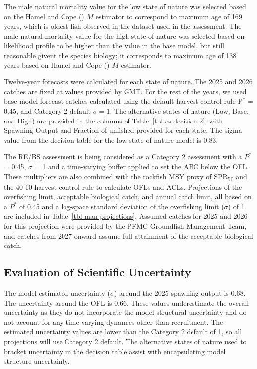 \documentclass[
]{article}
\begin{document}
The male natural mortality value for the low state of nature was
selected based on the Hamel and Cope
() \(M\) estimator to
correspond to maximum age of 169 years, which is oldest fish observed in
the dataset used in the assessment. The male natural mortality value for
the high state of nature was selected based on likelihood profile to be
higher than the value in the base model, but still reasonable givent the
species biology; it corresponds to maximum age of 138 years based on
Hamel and Cope () \(M\)
estimator.

Twelve-year forecasts were calculated for each state of nature. The 2025
and 2026 catches are fixed at values provided by GMT. For the rest of
the years, we used base model forecast catches calculated using the
default harvest control rule P\(^*\) = 0.45, and Category 2 default
\(\sigma = 1\). The alternative states of nature (Low, Base, and High)
are provided in the columns of Table~\ref{tbl-es-decision-2}, with
Spawning Output and Fraction of unfished provided for each state. The
sigma value from the decision table for the low state of nature model is
0.83.

The RE/BS assessment is being considered as a Category 2 assessment with
a \(P^*\) = 0.45, \(\sigma\) = 1 and a time-varying buffer applied to
set the ABC below the OFL. These multipliers are also combined with the
rockfish MSY proxy of SPR\textsubscript{50} and the 40-10 harvest
control rule to calculate OFLs and ACLs. Projections of the overfishing
limit, acceptable biological catch, and annual catch limit, all based on
a \(P^*\) of 0.45 and a log-space standard deviation of the overfishing
limit (\(\sigma\)) of 1 are included in Table~\ref{tbl-man-projections}.
Assumed catches for 2025 and 2026 for this projection were provided by
the PFMC Groundfish Management Team, and catches from 2027 onward assume
full attainment of the acceptable biological catch.

\subsection{Evaluation of Scientific Uncertainty}\label{sec-uncertainty}

The model estimated uncertainty (\(\sigma\)) around the 2025 spawning
output is 0.68. The uncertainty around the OFL is 0.66. These values
underestimate the overall uncertainty as they do not incorporate the
model structural uncertainty and do not account for any time-varying
dynamics other than recruitment. The estimated uncertainty values are
lower than the Category 2 default of 1, so all projections will use
Category 2 default. The alternative states of nature used to bracket
uncertainty in the decision table assist with encapsulating model
structure uncertainty.
\end{document}
